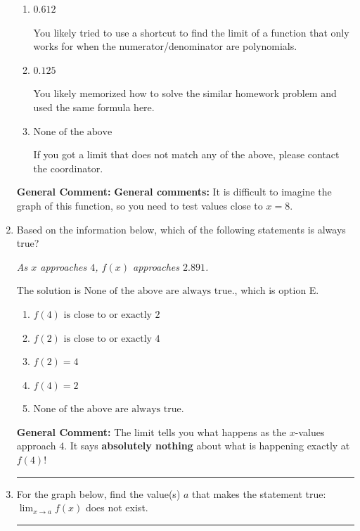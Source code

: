 \documentclass{extbook}[14pt]
\newcommand{\litem}[1]{\item #1

\rule{\textwidth}{0.4pt}}
\begin{document}
\begin{enumerate}
{\begin{enumerate}[label=\Alph*.]
You likely believed that since the denominator is equal to 0, the limit is infinity.
\item \( 0.612 \)

You likely tried to use a shortcut to find the limit of a function that only works for when the numerator/denominator are polynomials.
\item \( 0.125 \)

You likely memorized how to solve the similar homework problem and used the same formula here.
\item \( \text{None of the above} \)

If you got a limit that does not match any of the above, please contact the coordinator.
\end{enumerate}

\textbf{General Comment:} \textbf{General comments:} It is difficult to imagine the graph of this function, so you need to test values close to $x = 8$.
}
\litem{
Based on the information below, which of the following statements is always true?

\begin{center}
    \textit{ As $x$ approaches $4$, $f(x)$ approaches $2.891$. }
\end{center}
The solution is \( \text{None of the above are always true.} \), which is option E.\begin{enumerate}[label=\Alph*.]
\item \( f(4) \text{ is close to or exactly } 2 \)


\item \( f(2) \text{ is close to or exactly } 4 \)


\item \( f(2) = 4 \)


\item \( f(4) = 2 \)


\item \( \text{None of the above are always true.} \)


\end{enumerate}

\textbf{General Comment:} The limit tells you what happens as the $x$-values approach $4$. It says \textbf{absolutely nothing} about what is happening exactly at $f(4)$!
}
\litem{
For the graph below, find the value(s) $a$ that makes the statement true: $ \displaystyle \lim_{x \rightarrow a} f(x)$ does not exist.

}
\end{enumerate}
\end{document}
